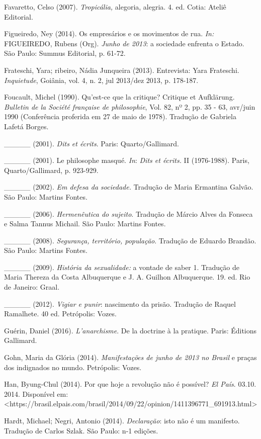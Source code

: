 Favaretto, Celso (2007). \emph{Tropicália, }alegoria, alegria. 4. ed.
Cotia: Ateliê Editorial.

Figueiredo, Ney (2014). Os empresários e os movimentos de rua. \emph{In:
}FIGUEIREDO, Rubens (Org). \emph{Junho de 2013}: a sociedade enfrenta o
Estado. São Paulo: Summus Editorial, p. 61-72.

Frateschi, Yara; ribeiro, Nádia Junqueira (2013). Entrevista: Yara
Frateschi. \emph{Inquietude}, Goiânia, vol. 4, n. 2, jul 2013/dez 2013,
p. 178-187.

Foucault, Michel (1990). Qu'est-ce que la critique? Critique et
Aufklärung. \emph{Bulletin de la Société française de philosophie}, Vol.
82, nº 2, pp. 35 - 63, avr/juin 1990 (Conferência proferida em 27 de
maio de 1978). Tradução de Gabriela Lafetá Borges.

\_\_\_\_\_ (2001). \emph{Dits et écrits}. Paris: Quarto/Gallimard.

\_\_\_\_\_ (2001). Le philosophe masqué. \emph{In}: \emph{Dits et
écrits. }II (1976-1988). Paris, Quarto/Gallimard, p. 923-929.

\_\_\_\_\_ (2002). \emph{Em defesa da sociedade.} Tradução de Maria
Ermantina Galvão. São Paulo: Martins Fontes.

\_\_\_\_\_ (2006). \emph{Hermenêutica do sujeito}. Tradução de Márcio
Alves da Fonseca e Salma Tannus Michail. São Paulo: Martins Fontes.

\_\_\_\_\_ (2008). \emph{Segurança, território, população}. Tradução de
Eduardo Brandão. São Paulo: Martins Fontes.

\_\_\_\_\_ (2009). \emph{História da sexualidade:} a vontade de saber 1.
Tradução de Maria Thereza da Costa Albuquerque e J. A. Guilhon
Albuquerque. 19. ed. Rio de Janeiro: Graal.

\_\_\_\_\_ (2012). \emph{Vigiar e punir}: nascimento da prisão. Tradução
de Raquel Ramalhete. 40 ed. Petrópolis: Vozes.

Guérin, Daniel (2016). \emph{L'anarchisme}. De la doctrine à la
pratique. Paris: Éditions Gallimard.

Gohn, Maria da Glória (2014). \emph{Manifestações de junho de 2013 no
Brasil} e praças dos indignados no mundo. Petrópolis: Vozes.

Han, Byung-Chul (2014). Por que hoje a revolução não é possível?
\emph{El País}. 03.10. 2014. Disponível em:
\textless{}https://brasil.elpais.com/brasil/2014/09/22/opinion/1411396771\_691913.html\textgreater{}

Hardt, Michael; Negri, Antonio (2014). \emph{Declaração}: isto não é um
manifesto. Tradução de Carlos Szlak. São Paulo: n-1 edições.


